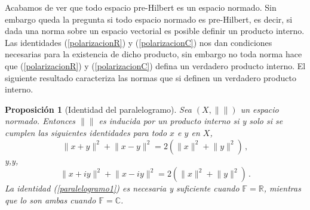 \documentclass[12pt]{book}
\newtheorem{prop}{\bf Proposición}[chapter]
\def\RR{\mathbb{R}}
\def\CC{\mathbb{C}}
\def\FF{\mathbb{F}}
\newcommand{\norm}[1]{\lVert #1\rVert }
\begin{document}
 Acabamos de  ver que todo espacio pre-Hilbert  es un espacio normado. Sin embargo queda la pregunta  si todo espacio normado es pre-Hilbert, es decir,  si dada una norma sobre un espacio vectorial es posible definir  un producto interno. Las identidades (\ref{polarizacionR}) y (\ref{polarizacionC}) nos  dan condiciones necesarias  para la existencia de  dicho producto, sin embargo no toda norma hace que (\ref{polarizacionR}) y (\ref{polarizacionC})   defina un verdadero producto interno. El siguiente resultado caracteriza las normas que si definen un verdadero producto interno.
 
\begin{prop}[Identidad del  paralelogramo] Sea $(X,\norm{})$ un espacio normado. Entonces $\norm{}$  es inducida por un  producto interno si y solo si  se cumplen las siguientes identidades para todo $x$ e $y$ en $X$,
\begin{equation}
\norm{x+y}^2+\norm{x-y}^2 =  2\left(\norm{x}^2+\norm{y}^2\right)\,,\label{paralelogramo1}
\end{equation}
y,y,
\begin{equation}
\norm{x+iy}^2+\norm{x-iy}^2 =2\left(\norm{x}^2+\norm{y}^2\right)\,.\label{paralelogramo2}
\end{equation}
La identidad (\ref{paralelogramo1}) es necesaria y suficiente cuando $\FF=\RR$, mientras que lo  son ambas cuando $\FF=\CC$.
\end{prop}
\end{document}
